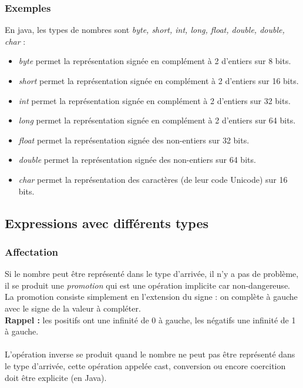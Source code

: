 \documentclass[a4paper,10pt]{book}
\begin{document}
\subsubsection{Exemples}
En java, les types de nombres sont \textit{byte, short, int, long, float, double, double, char} :\\

\begin{itemize}\renewcommand{\labelitemi}{$\bullet$}
\item \textit{byte} permet la représentation signée en complément à 2 d'entiers sur 8 bits.
\item \textit{short} permet la représentation signée en complément à 2 d'entiers sur 16 bits.
\item \textit{int} permet la représentation signée en complément à 2 d'entiers sur 32 bits.
\item \textit{long} permet la représentation signée en complément à 2 d'entiers sur 64 bits.
\item \textit{float} permet la représentation signée des non-entiers sur 32 bits.
\item \textit{double} permet la représentation signée des non-entiers sur 64 bits.
\item \textit{char} permet la représentation des caractères (de leur code Unicode) sur 16 bits.
\end{itemize}

\subsection{Expressions avec différents types}
\subsubsection{Affectation}

Si le nombre peut être représenté dans le type d'arrivée, il n'y a pas de problème, il se produit une \emph{promotion} qui est une opération implicite car non-dangereuse.\\

La promotion consiste simplement en l’extension du signe : on complète à gauche avec le signe de la valeur à compléter.\\

\textbf{Rappel :} les positifs ont une infinité de 0 à gauche, les négatifs une infinité de 1 à gauche.\\\\

L'opération inverse se produit quand le nombre ne peut pas être représenté dans le type d'arrivée, cette opération appelée cast, conversion ou encore coercition doit être explicite (en Java).\\
\end{document}
